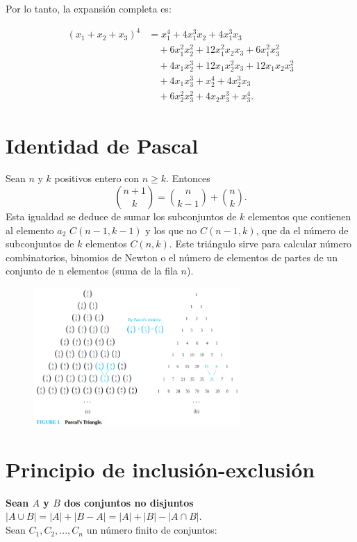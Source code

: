 \documentclass{article}
\begin{document}
Por lo tanto, la expansión completa es:

\begin{equation}
\begin{aligned}
(x_1 + x_2 + x_3)^4 &= x_1^4 + 4x_1^3 x_2 + 4x_1^3 x_3 \\
&\quad + 6x_1^2 x_2^2 + 12x_1^2 x_2 x_3 + 6x_1^2 x_3^2 \\
&\quad + 4x_1 x_2^3 + 12x_1 x_2^2 x_3 + 12x_1 x_2 x_3^2 \\
&\quad + 4x_1 x_3^3 + x_2^4 + 4x_2^3 x_3 \\
&\quad + 6x_2^2 x_3^2 + 4x_2 x_3^3 + x_3^4.
\end{aligned}
\end{equation}

\newpage

\section{Identidad de Pascal}
Sean $n$ y $k$ positivos entero con $n \geq k$. Entonces 
$$\binom{n+1}{k} = \binom{n}{k-1} + \binom{n}{k}.$$
Esta igualdad se deduce de sumar los subconjuntos de $k$ elementos que contienen al elemento $a_2$ $C(n-1, k-1)$ y los que no $C(n-1, k)$, que da el número de subconjuntos de $k$ elementos $C(n, k)$. Este triángulo sirve para calcular número combinatorios, binomios de Newton o el número de elementos de partes de un conjunto de n elementos (suma de la fila $n$).

\begin{figure}[h]
    \centering
    \includegraphics[width=0.7\textwidth]{img-t2/img_881_04.png}
\end{figure}

\newpage

\section{Principio de inclusión-exclusión}
\textbf{Sean $A$ y $B$ dos conjuntos no disjuntos $|A \cup B| = |A| + |B-A| = |A| + |B| - |A \cap B|$}. \\
Sean $C_1, C_2, ..., C_n$ un número finito de conjuntos:
\end{document}
